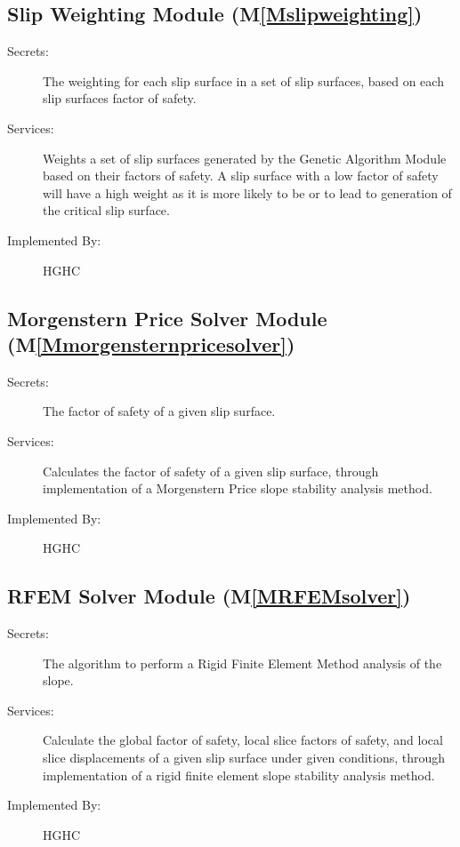 \documentclass[12pt]{article}
\begin{document}
\subsection{Slip Weighting Module (M\ref{Mslipweighting})}
\label{Sec:SWM()}
\begin{description}
\item[Secrets:]The weighting for each slip surface in a set of slip surfaces, based on each slip surfaces factor of safety.
\item[Services:]Weights a set of slip surfaces generated by the Genetic Algorithm Module based on their factors of safety. A slip surface with a low factor of safety will have a high weight as it is more likely to be or to lead to generation of the critical slip surface.
\item[Implemented By:]HGHC
\end{description}
\subsection{Morgenstern Price Solver Module (M\ref{Mmorgensternpricesolver})}
\label{Sec:MPSM()}
\begin{description}
\item[Secrets:]The factor of safety of a given slip surface.
\item[Services:]Calculates the factor of safety of a given slip surface, through implementation of a Morgenstern Price slope stability analysis method.
\item[Implemented By:]HGHC
\end{description}
\subsection{RFEM Solver Module (M\ref{MRFEMsolver})}
\label{Sec:RSM()}
\begin{description}
\item[Secrets:]The algorithm to perform a Rigid Finite Element Method analysis of the slope.
\item[Services:]Calculate the global factor of safety, local slice factors of safety, and local slice displacements of a given slip surface under given conditions, through implementation of a rigid finite element slope stability analysis method.
\item[Implemented By:]HGHC
\end{description}
\end{document}
